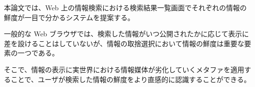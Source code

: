 


\begin{jabstract}

本論文では、Web 上の情報検索における検索結果一覧画面でそれぞれの情報の鮮度が一目で分かるシステムを提案する。

一般的な Web ブラウザでは、検索した情報がいつ公開されたかに応じて表示に差を設けることはしていないが、情報の取捨選択において情報の鮮度は重要な要素の一つである。

そこで、情報の表示に実世界における情報媒体が劣化していくメタファを適用することで、ユーザが検索した情報の鮮度をより直感的に認識することができる。

\end{jabstract}
